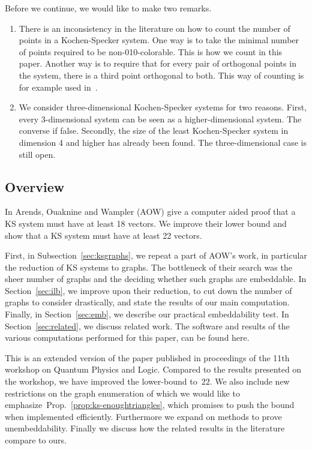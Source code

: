 \documentclass{report}
\begin{document}
Before we continue, we would like to make two remarks.
\begin{enumerate}
\item
There is an inconsistency in the literature on how to count the number
of points in a Kochen-Specker system.  One way is to take the minimal
number of points required to be non-010-colorable.
This is how we count in this paper.
Another way is to require that for every pair of orthogonal points
in the system, there is a third point orthogonal to both.
This way of counting is for example used in~\cite{pavivcic}.
\item
We consider three-dimensional Kochen-Specker systems
for two reasons.
First, every 3-dimensional system can be seen as a higher-dimensional
            system.   The converse if false.
Secondly, the size of the least Kochen-Specker system
            in dimension 4 and higher has already been found.\cite{pavivcic}
            The three-dimensional case is still open.
\end{enumerate}

\subsection{Overview}
In \cite{aow11} Arends, Ouaknine and Wampler (AOW) give a computer aided proof
that a KS system must have at least 18 vectors.  We improve their lower bound
and show that a KS system must have at least 22 vectors.

First, in Subsection~\ref{sec:ksgraphs},
we repeat a part of AOW's work, in particular the reduction of
KS systems to graphs.
The bottleneck of their search was the sheer number of graphs
and the deciding whether such graphs are embeddable.
In Section~\ref{sec:ilb},
we improve upon their reduction,
to cut down the number of graphs to consider drastically,
and state the results of our main computation.
Finally, in Section~\ref{sec:emb},
we describe our practical embeddability test.
In Section~\ref{sec:related},
we discuss related work.
The software and results of the various computations performed for
this paper, can be found here\cite{GH}.

This is an extended version of the paper published in proceedings
of the 11th workshop on Quantum Physics and Logic.\cite{UW14}
Compared to the results presented on the workshop,
we have improved the lower-bound to~$22$.
We also include new restrictions on the graph enumeration
of which we would like to emphasize~Prop.~\ref{prop:ks-enoughtriangles},
which promises to push the bound when implemented efficiently.
Furthermore we expand on methods to prove unembeddability.
Finally we discuss how the related results in the literature
compare to ours.
\end{document}
